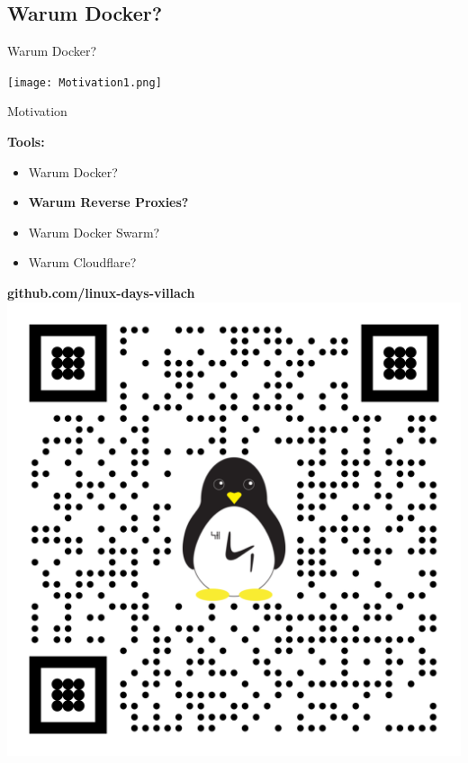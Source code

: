 \documentclass[10pt, unknownkeysallowed]{beamer}
\begin{document}
\subsection{Warum Docker?}


\begin{frame}{Warum Docker?}
\begin{minipage}{\textwidth}
    \texttt{[image: Motivation1.png]}
\end{minipage}
\end{frame}

\begin{frame}{Motivation}
\begin{minipage}{.45\textwidth}
    \vspace*{5px}
    \textbf{Tools:}
	\begin{itemize}
	    \item Warum Docker?
		\item \textbf{Warum Reverse Proxies?}
		\item Warum Docker Swarm?
		\item Warum Cloudflare?
	\end{itemize}
	\vspace*{10px}
\end{minipage}
\hfill\vline\hfill
\begin{minipage}{.45\textwidth}
    \vspace*{15px}
    \textbf{github.com/linux-days-villach}
    \includegraphics[width=\linewidth,center]{qr-code.png}

\end{minipage}
\end{frame}
\end{document}
